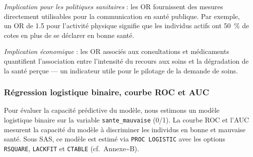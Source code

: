 \documentclass[11pt,a4paper]{memoirerecherche}
\begin{document}
\emph{Implication pour les politiques sanitaires} : les OR fournissent des mesures directement utilisables pour la communication en santé publique. Par exemple, un OR de 1.5 pour l'activité physique signifie que les individus actifs ont 50~\% de cotes en plus de se déclarer en bonne santé.

\emph{Implication économique} : les OR associés aux consultations et médicaments quantifient l'association entre l'intensité du recours aux soins et la dégradation de la santé perçue --- un indicateur utile pour le pilotage de la demande de soins.

\hypertarget{ruxe9gression-logistique-binaire-courbe-roc-et-auc}{%
\subsubsection{Régression logistique binaire, courbe ROC et AUC}\label{ruxe9gression-logistique-binaire-courbe-roc-et-auc}}

Pour évaluer la capacité prédictive du modèle, nous estimons un modèle logistique binaire sur la variable \texttt{sante\_mauvaise} (0/1). La courbe ROC et l'AUC mesurent la capacité du modèle à discriminer les individus en bonne et mauvaise santé. Sous SAS, ce modèle est estimé via \texttt{PROC\ LOGISTIC} avec les options \texttt{RSQUARE}, \texttt{LACKFIT} et \texttt{CTABLE} (cf.~Annexe\textasciitilde B).
\end{document}
